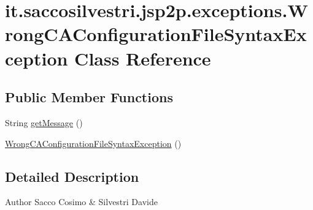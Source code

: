 \hypertarget{classit_1_1saccosilvestri_1_1jsp2p_1_1exceptions_1_1_wrong_c_a_configuration_file_syntax_exception}{
\section{it.saccosilvestri.jsp2p.exceptions.\-Wrong\-C\-A\-Configuration\-File\-Syntax\-Exception \-Class \-Reference}
\label{classit_1_1saccosilvestri_1_1jsp2p_1_1exceptions_1_1_wrong_c_a_configuration_file_syntax_exception}
}
\subsection*{\-Public \-Member \-Functions}
\begin{DoxyCompactItemize}
\item 
\-String \hyperlink{classit_1_1saccosilvestri_1_1jsp2p_1_1exceptions_1_1_wrong_c_a_configuration_file_syntax_exception_a3738e705e95ffcdcc05b481dd5da646f}{get\-Message} ()
\item 
\hyperlink{classit_1_1saccosilvestri_1_1jsp2p_1_1exceptions_1_1_wrong_c_a_configuration_file_syntax_exception_aed8402ac4aa933aa5b868022db33d93c}{\-Wrong\-C\-A\-Configuration\-File\-Syntax\-Exception} ()
\end{DoxyCompactItemize}


\subsection{\-Detailed \-Description}
\begin{DoxyAuthor}{\-Author}
\-Sacco \-Cosimo \& \-Silvestri \-Davide 
\end{DoxyAuthor}


